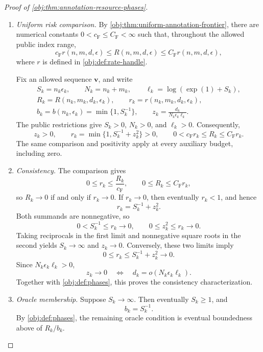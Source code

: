 \begin{proof}[Proof of \cref{obj:thm:annotation-resource-phases}]
\begin{enumerate}
\item \emph{Uniform risk comparison.}
By \cref{obj:thm:uniform-annotation-frontier}, there are numerical constants \(0<c_{\mathrm F}\le C_{\mathrm F}<\infty\) such that, throughout the allowed public index range,
\[
c_{\mathrm F}r(n,m,d,\epsilon)
\le R(n,m,d,\epsilon)
\le C_{\mathrm F}r(n,m,d,\epsilon),
\]
where \(r\) is defined in \cref{obj:def:rate-handle}.

Fix an allowed sequence \(\mathbf v\), and write
\[
\begin{gathered}
S_k=n_k\epsilon_k,\qquad
N_k=n_k+m_k,\qquad
\ell_k=\log(\exp(1)+S_k),\\
R_k=R(n_k,m_k,d_k,\epsilon_k),\qquad
r_k=r(n_k,m_k,d_k,\epsilon_k),\\
b_k=b(n_k,\epsilon_k)=\min\{1,S_k^{-1}\},\qquad
z_k=\frac{d_k}{N_k\epsilon_k\ell_k}.
\end{gathered}
\]
The public restrictions give \(S_k>0\), \(N_k>0\), and \(\ell_k>0\). Consequently,
\[
z_k>0,\qquad
r_k=\min\{1,S_k^{-1}+z_k^2\}>0,\qquad
0<c_{\mathrm F}r_k\le R_k\le C_{\mathrm F}r_k.
\]
The same comparison and positivity apply at every auxiliary budget, including zero.

\item \emph{Consistency.}
The comparison gives
\[
0\le r_k\le \frac{R_k}{c_{\mathrm F}},
\qquad
0\le R_k\le C_{\mathrm F}r_k,
\]
so \(R_k\to0\) if and only if \(r_k\to0\). If \(r_k\to0\), then eventually \(r_k<1\), and hence
\[
r_k=S_k^{-1}+z_k^2.
\]
Both summands are nonnegative, so
\[
0<S_k^{-1}\le r_k\longrightarrow0,
\qquad
0\le z_k^2\le r_k\longrightarrow0.
\]
Taking reciprocals in the first limit and nonnegative square roots in the second yields \(S_k\to\infty\) and \(z_k\to0\). Conversely, these two limits imply
\[
0\le r_k\le S_k^{-1}+z_k^2\longrightarrow0.
\]
Since \(N_k\epsilon_k\ell_k>0\),
\[
z_k\longrightarrow0
\quad\Longleftrightarrow\quad
d_k=o(N_k\epsilon_k\ell_k).
\]
Together with \cref{obj:def:phases}, this proves the consistency characterization.

\item \emph{Oracle membership.}
Suppose \(S_k\to\infty\). Then eventually \(S_k\ge1\), and
\[
b_k=S_k^{-1}.
\]
By \cref{obj:def:phases}, the remaining oracle condition is eventual boundedness above of \(R_k/b_k\).


\end{enumerate}
\end{proof}
